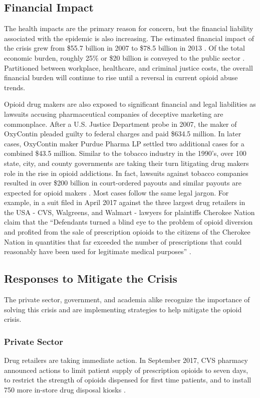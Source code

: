 \documentclass[sigconf]{acmart}
\begin{document}
\subsection{Financial Impact} 
The health impacts are the primary reason for concern, but the financial liability associated with the epidemic is also increasing. The estimated financial impact of the crisis grew from \$55.7 billion in 2007 \cite{Birnbaum01} to \$78.5 billion in 2013 \cite{Florence01}. Of the total economic burden, roughly 25\% or \$20 billion is conveyed to the public sector \cite{Florence01}. Partitioned between workplace, healthcare, and criminal justice costs, the overall financial burden will continue to rise until a reversal in current opioid abuse trends. 

Opioid drug makers are also exposed to significant financial and legal liabilities as lawsuits accusing pharmaceutical companies of deceptive marketing are commonplace. After a U.S. Justice Department probe in 2007, the maker of OxyContin pleaded guilty to federal charges and paid \$634.5 million. In later cases, OxyContin maker Purdue Pharma LP settled two additional cases for a combined \$43.5 million. Similar to the tobacco industry in the 1990's, over 100 state, city, and county governments are taking their turn litigating drug makers role in the rise in opioid addictions. In fact, lawsuits against tobacco companies resulted in over \$200 billion in court-ordered payouts and similar payouts are expected for opioid makers \cite{Quinn01}. Most cases follow the same legal jargon. For example, in a suit filed in April 2017 against the three largest drug retailers in the USA - CVS, Walgreens, and Walmart - lawyers for plaintiffs Cherokee Nation claim that the ``Defendants turned a blind eye to the problem of opioid diversion and profited from the sale of prescription opioids to the citizens of the Cherokee Nation in quantities that far exceeded the number of prescriptions that could reasonably have been used for legitimate medical purposes'' \cite{opsis5}.

\subsection{Responses to Mitigate the Crisis}
The private sector, government, and academia alike recognize the importance of solving this crisis and are implementing strategies to help mitigate the opioid crisis. 

\subsubsection{Private Sector}
Drug retailers are taking immediate action. In September 2017, CVS pharmacy announced actions to limit patient supply of prescription opioids to seven days, to restrict the strength of opioids dispensed for first time patients, and to install 750 more in-store drug disposal kiosks \cite{Charles01} \cite{Hansen01}.
\end{document}

